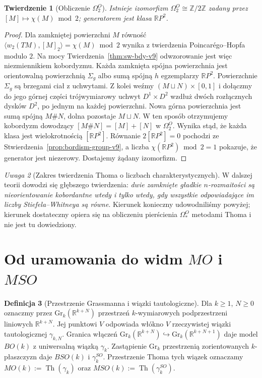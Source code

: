 \documentclass[11pt,a4paper,oneside]{report}
\newcommand{\R}{\mathbb{R}}
\newcommand{\Z}{\mathbb{Z}}
\theoremstyle{plain}
\newtheorem{twierdzenie}{Twierdzenie}[section]
\theoremstyle{definition}
\newtheorem{definicja}[twierdzenie]{Definicja}
\theoremstyle{remark}
\newtheorem{uwaga}[twierdzenie]{Uwaga}
\begin{document}
\begin{twierdzenie}[Obliczenie $\Omega_2^O$]
\label{thm:omega2-v9}
Istnieje izomorfizm
$\Omega_2^O\cong\Z/2\Z$ zadany przez
$[M]\mapsto\chi(M)\bmod2$; generatorem jest
klasa $\R P^2$.
\end{twierdzenie}
\begin{proof}
Dla zamkniętej powierzchni $M$ równość
$\langle w_2(TM),[M]_2\rangle=\chi(M)\bmod2$
wynika z twierdzenia Poincarégo--Hopfa modulo $2$.
Na mocy Twierdzenia~\ref{thm:sw-bdy-v9} odwzorowanie
jest więc niezmiennikiem kobordyzmu.
Każda zamknięta spójna powierzchnia jest orientowalną
powierzchnią $\Sigma_g$ albo sumą spójną $h$ egzemplarzy
$\R P^2$. Powierzchnie $\Sigma_g$ są brzegami ciał
z uchwytami. Z kolei weźmy
$(M\sqcup N)\times[0,1]$ i dołączmy do jego górnej
części trójwymiarowy uchwyt $D^1\times D^2$
wzdłuż dwóch rozłącznych dysków $D^2$,
po jednym na każdej powierzchni. Nowa górna
powierzchnia jest sumą spójną $M\#N$,
dolna pozostaje $M\sqcup N$. W ten sposób
otrzymujemy kobordyzm dowodzący
$[M\#N]=[M]+[N]$ w $\Omega_2^O$.
Wynika stąd, że każda klasa jest wielokrotnością
$[\R P^2]$. Równanie $2[\R P^2]=0$ pochodzi
ze Stwierdzenia~\ref{prop:bordism-group-v9}, a liczba
$\chi(\R P^2)\bmod2=1$ pokazuje, że generator
jest niezerowy. Dostajemy żądany izomorfizm.
\end{proof}

\begin{uwaga}[Zakres twierdzenia Thoma o liczbach charakterystycznych]
W dalszej teorii dowodzi się głębszego twierdzenia:
\emph{dwie zamknięte gładkie $n$-rozmaitości są
nieorientowanie kobordantne wtedy i tylko wtedy, gdy
wszystkie odpowiadające im liczby Stiefela--Whitneya
są równe}. Kierunek konieczny udowodniliśmy powyżej;
kierunek dostateczny opiera się na obliczeniu pierścienia
$\Omega_*^O$ metodami Thoma i nie jest tu dowiedziony.
\end{uwaga}

\section{Od uramowania do widm \texorpdfstring{$MO$ i $MSO$}{MO i MSO}}
\begin{definicja}[Przestrzenie Grassmanna i wiązki tautologiczne]
Dla $k\ge1$, $N\ge0$ oznaczmy przez
$\mathrm{Gr}_k(\R^{k+N})$ przestrzeń $k$-wymiarowych
podprzestrzeni liniowych $\R^{k+N}$. Jej punktowi $V$
odpowiada włókno $V$ rzeczywistej wiązki tautologicznej
$\gamma_{k,N}$. Granica włączeń
$\mathrm{Gr}_k(\R^{k+N})\hookrightarrow
\mathrm{Gr}_k(\R^{k+N+1})$ daje model $BO(k)$
z uniwersalną wiązką $\gamma_k$. Zastąpienie
$\mathrm{Gr}_k$ przestrzenią zorientowanych
$k$-płaszczyzn daje $BSO(k)$ i $\gamma_k^{SO}$.
Przestrzenie Thoma tych wiązek oznaczamy
$MO(k):=\operatorname{Th}(\gamma_k)$ oraz
$MSO(k):=\operatorname{Th}(\gamma_k^{SO})$.
\end{definicja}
\end{document}

